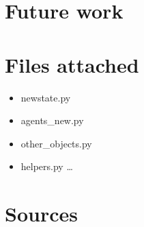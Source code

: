\documentclass{article}
\begin{document}
\section{Future work}

\pagebreak


\section{Files attached}

\begin{itemize}
\item newstate.py
\item agents\_new.py
\item other\_objects.py
\item helpers.py \ldots
\end{itemize}


\section{Sources}

\nocite{*}
\printbibliography


\begin{comment}


\begin{itemize}
	\item [1] Barto and Sutton (http://webdocs.cs.ualberta.ca/~sutton/book/the-book.html) \ldots
\end{itemize}
\end{comment}
\end{document}
